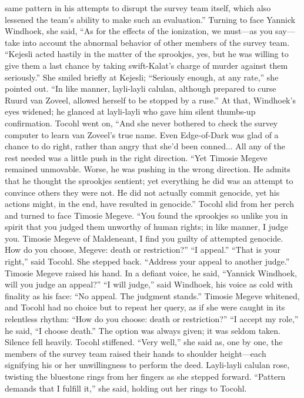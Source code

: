 \documentclass[9pt]{article}
\begin{document}
same pattern in his attempts to disrupt the survey team itself, which also lessened the team’s ability to
make such an evaluation.”
Turning to face Yannick Windhoek, she said, “As for the effects of the ionization, we must—as you
say—take into account the abnormal behavior of other members of the survey team.
“Kejesli acted hastily in the matter of the sprookjes, yes, but he was willing to give them a last chance
by taking swift-Kalat’s charge of murder against them seriously.” She smiled briefly at Kejesli; “Seriously
enough, at any rate,” she pointed out.
“In like manner, layli-layli calulan, although prepared to curse Ruurd van Zoveel, allowed herself to
be stopped by a ruse.” At that, Windhoek’s eyes widened; he glanced at layli-layli who gave him silent
thumbs-up confirmation. Tocohl went on, “And she never bothered to check the survey computer to
learn van Zoveel’s true name. Even Edge-of-Dark was glad of a chance to do right, rather than angry
that she’d been conned... All any of the rest needed was a little push in the right direction.
“Yet Timosie Megeve remained unmovable. Worse, he was pushing in the wrong direction. He
admits that he thought the sprookjes sentient; yet everything he did was an attempt to convince others
they were not. He did not actually commit genocide, yet his actions might, in the end, have resulted in
genocide.”
Tocohl slid from her perch and turned to face Timosie Megeve. “You found the sprookjes so unlike
you in spirit that you judged them unworthy of human rights; in like manner, I judge you. Timosie Megeve
of Maldeneant, I find you guilty of attempted genocide. How do you choose, Megeve: death or
restriction?”
“I appeal.”
“That is your right,” said Tocohl. She stepped back. “Address your appeal to another judge.”
Timosie Megeve raised his hand. In a defiant voice, he said, “Yannick Windhoek, will you judge an
appeal?”
“I will judge,” said Windhoek, his voice as cold with finality as his face: “No appeal. The judgment
stands.”
Timosie Megeve whitened, and Tocohl had no choice but to repeat her query, as if she were caught
in its relentless rhythm: “How do you choose: death or restriction?”
“I accept my role,” he said, “I choose death.”
The option was always given; it was seldom taken. Silence fell heavily. Tocohl stiffened. “Very well,”
she said as, one by one, the members of the survey team raised their hands to shoulder height—each
signifying his or her unwillingness to perform the deed.
Layli-layli calulan rose, twisting the bluestone rings from her fingers as she stepped forward.
“Pattern demands that I fulfill it,” she said, holding out her rings to Tocohl.
\end{document}
